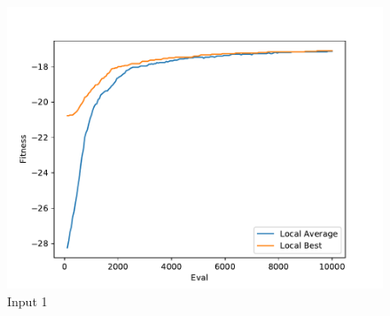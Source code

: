 \documentclass{standalone}
\begin{document}
\begin{figure}[!htb]
	\caption{Input 1}
	\label{fig:graph_1058}
	\includegraphics[width=\textwidth]{../graphs/graphs/1058.pdf}
\end{figure}
\end{document}
